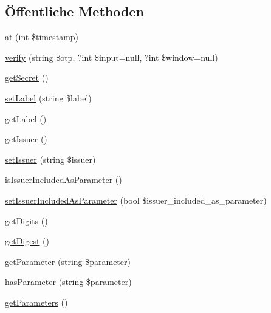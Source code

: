 \subsection*{Öffentliche Methoden}
\begin{DoxyCompactItemize}
\item 
\mbox{\hyperlink{interface_o_t_p_h_p_1_1_o_t_p_interface_afbc45b669ea3ae41d0b252901de69d54}{at}} (int \$timestamp)
\item 
\mbox{\hyperlink{interface_o_t_p_h_p_1_1_o_t_p_interface_a3a3057844ac7376a733322275f955f5e}{verify}} (string \$otp, ?int \$input=null, ?int \$window=null)
\item 
\mbox{\hyperlink{interface_o_t_p_h_p_1_1_o_t_p_interface_ab32d0488aaaf79a6c6bcc2a63ef8a1f1}{get\+Secret}} ()
\item 
\mbox{\hyperlink{interface_o_t_p_h_p_1_1_o_t_p_interface_a0cbf5bc9ceef09f331bad8842b2ca3ce}{set\+Label}} (string \$label)
\item 
\mbox{\hyperlink{interface_o_t_p_h_p_1_1_o_t_p_interface_a6e678de1987420ba53f9a35e36828a8a}{get\+Label}} ()
\item 
\mbox{\hyperlink{interface_o_t_p_h_p_1_1_o_t_p_interface_a8b532c6c1ea3bbbe61b6719f875bc959}{get\+Issuer}} ()
\item 
\mbox{\hyperlink{interface_o_t_p_h_p_1_1_o_t_p_interface_a1892d913d0dd0e73ee3235494d47ba4d}{set\+Issuer}} (string \$issuer)
\item 
\mbox{\hyperlink{interface_o_t_p_h_p_1_1_o_t_p_interface_aea4b15b8f9dc0adc7924090e0908afb6}{is\+Issuer\+Included\+As\+Parameter}} ()
\item 
\mbox{\hyperlink{interface_o_t_p_h_p_1_1_o_t_p_interface_ab88b212c288fd17da38121979f9e50b1}{set\+Issuer\+Included\+As\+Parameter}} (bool \$issuer\+\_\+included\+\_\+as\+\_\+parameter)
\item 
\mbox{\hyperlink{interface_o_t_p_h_p_1_1_o_t_p_interface_a7f449d46d42dd559ad6a0aa1deb3b2c0}{get\+Digits}} ()
\item 
\mbox{\hyperlink{interface_o_t_p_h_p_1_1_o_t_p_interface_afc5e0641afee53f57d7f9e97f65aa4e1}{get\+Digest}} ()
\item 
\mbox{\hyperlink{interface_o_t_p_h_p_1_1_o_t_p_interface_ade4b3c7737dea6a60bf81bfb4df6c6da}{get\+Parameter}} (string \$parameter)
\item 
\mbox{\hyperlink{interface_o_t_p_h_p_1_1_o_t_p_interface_aec06de027a5328d9d8116ff74540080d}{has\+Parameter}} (string \$parameter)
\item 
\mbox{\hyperlink{interface_o_t_p_h_p_1_1_o_t_p_interface_ac3b54b7ec1201cda34eafe25ecc8fa47}{get\+Parameters}} ()

\end{DoxyCompactItemize}
